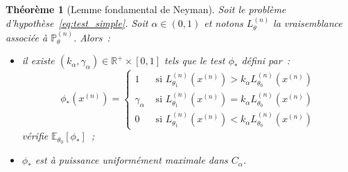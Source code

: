 \documentclass{report}
\renewcommand{\P}{\mathbb P}
\newcommand{\E}{\mathbb E}
\newcommand{\R}{\mathbb R}
\newcommand{\n}{{(n)}}
\newtheorem{thm}{Théorème}[chapter]
\theoremstyle{definition}
\theoremstyle{remark}
\begin{document}
		\begin{thm}[Lemme fondamental de Neyman] Soit le problème d'hypothèse~\eqref{eq:test_simple}. Soit $\alpha \in (0, 1)$ et notons $L_\theta^\n$ la
		vraisemblance associée à $\P_\theta^\n$. Alors~:
		\begin{itemize}
			\item[$(i)$]  il existe $(k_\alpha, \gamma_\alpha) \in \R^+ \times [0, 1]$ tels que le test $\phi_*$ défini par~:
			\[\phi_*(x^\n) =
			\begin{cases}
				1 &\text{ si } L_{\theta_1}^\n(x^\n) > k_\alpha L_{\theta_0}^\n(x^\n) \\
				\gamma_\alpha &\text{ si } L_{\theta_1}^\n(x^\n) = k_\alpha L_{\theta_0}^\n(x^\n) \\
				0 &\text{ si } L_{\theta_1}^\n(x^\n) < k_\alpha L_{\theta_0}^\n(x^\n)
			\end{cases}\]
			vérifie $\E_{\theta_0}[\phi_*]$~;

			\item $\phi_*$ est à puissance uniformément maximale dans $C_\alpha$.
		\end{itemize}
		\end{thm}
\end{document}
